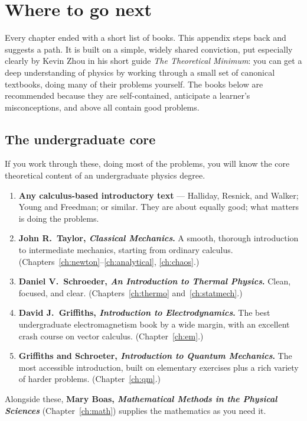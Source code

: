 \chapter{Where to go next}
\label{app:reading}

Every chapter ended with a short list of books. This appendix steps back and suggests a path. It is built on a simple, widely shared conviction, put especially clearly by Kevin Zhou in his short guide \emph{The Theoretical Minimum}: you can get a deep understanding of physics by working through a small set of canonical textbooks, doing many of their problems yourself. The books below are recommended because they are self-contained, anticipate a learner's misconceptions, and above all contain good problems.

\section*{The undergraduate core}

If you work through these, doing most of the problems, you will know the core theoretical content of an undergraduate physics degree.
\begin{enumerate}[itemsep=4pt]
  \item \textbf{Any calculus-based introductory text} --- Halliday, Resnick, and Walker; Young and Freedman; or similar. They are about equally good; what matters is doing the problems.
  \item \textbf{John R.\ Taylor, \emph{Classical Mechanics}.} A smooth, thorough introduction to intermediate mechanics, starting from ordinary calculus. (Chapters~\ref{ch:newton}--\ref{ch:analytical}, \ref{ch:chaos}.)
  \item \textbf{Daniel V.\ Schroeder, \emph{An Introduction to Thermal Physics}.} Clean, focused, and clear. (Chapters~\ref{ch:thermo} and~\ref{ch:statmech}.)
  \item \textbf{David J.\ Griffiths, \emph{Introduction to Electrodynamics}.} The best undergraduate electromagnetism book by a wide margin, with an excellent crash course on vector calculus. (Chapter~\ref{ch:em}.)
  \item \textbf{Griffiths and Schroeter, \emph{Introduction to Quantum Mechanics}.} The most accessible introduction, built on elementary exercises plus a rich variety of harder problems. (Chapter~\ref{ch:qm}.)
\end{enumerate}
Alongside these, \textbf{Mary Boas, \emph{Mathematical Methods in the Physical Sciences}} (Chapter~\ref{ch:math}) supplies the mathematics as you need it.

